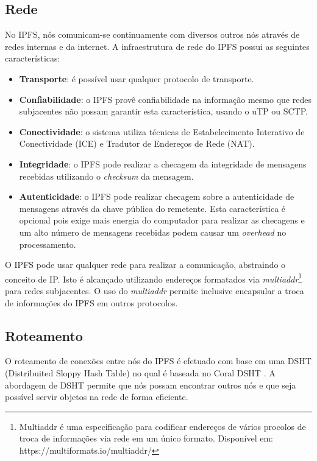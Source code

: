 \documentclass[tcc,capa]{texufpel}
\begin{document}
    \subsection{Rede}
        
        No IPFS, nós comunicam-se continuamente com diversos outros nós através de redes internas e da internet. A infraestrutura de rede do IPFS possui as seguintes características:
        
        \begin{itemize}
            \item \textbf{Transporte}: é possível usar qualquer protocolo de transporte.
            \item \textbf{Confiabilidade}: o IPFS provê confiabilidade na informação mesmo que redes subjacentes não possam garantir esta característica, usando o uTP ou SCTP.
            \item \textbf{Conectividade}: o sistema utiliza técnicas de Estabelecimento Interativo de Conectividade (ICE) e Tradutor de Endereços de Rede (NAT).
            \item \textbf{Integridade}: o IPFS pode realizar a checagem da integridade de mensagens recebidas utilizando o \textit{checksum} da mensagem.
            \item \textbf{Autenticidade}: o IPFS pode realizar checagem sobre a autenticidade de mensagens através da chave pública do remetente. Esta característica é opcional pois exige mais energia do computador para realizar as checagens e um alto número de mensagens recebidas podem causar um \textit{overhead} no processamento.
        \end{itemize}
        
        O IPFS pode usar qualquer rede para realizar a comunicação, abstraindo o conceito de IP. Isto é alcançado utilizando endereços formatados via \textit{multiaddr}\footnote{Multiaddr é uma especificação para codificar endereços de vários procolos de troca de informações via rede em um único formato. Disponível em: https://multiformats.io/multiaddr/} para redes subjacentes. O uso do \textit{multiaddr} permite inclusive encapsular a troca de informações do IPFS em outros protocolos.
        
        \subsection{Roteamento}
        
        O roteamento de conexões entre nós do IPFS é efetuado com base em uma DSHT (Distribuited Sloppy Hash Table) no qual é baseada no Coral DSHT \cite{freedman2003sloppy}. A abordagem de DSHT permite que nós possam encontrar outros nós e que seja possível servir objetos na rede de forma eficiente. 
        
\end{document}
